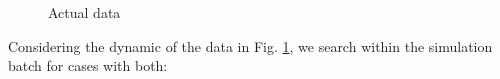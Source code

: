 \documentclass[graybox]{svmult}
\begin{document}
\begin{figure}[t]

     \begin{subfigure}{0.48\textwidth}
         \centering
         \label{actualA}
     \end{subfigure}
     \hfill
     \begin{subfigure}{0.48\textwidth}
         \centering
         \label{actualB}
     \end{subfigure}
     \caption{Actual data}
     \label{actualData}
\end{figure}



Considering the dynamic of the data in Fig. \ref{actualA}, we search within the simulation batch for  cases with both:
\end{document}
